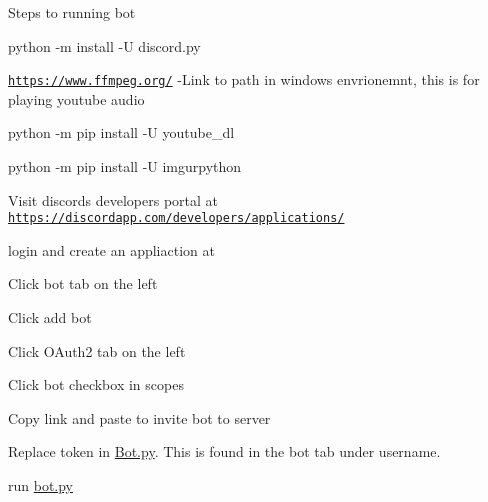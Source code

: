 Steps to running bot


\begin{DoxyEnumerate}
\item python -\/m install -\/U discord.\+py
\item \href{https://www.ffmpeg.org/}{\tt https\+://www.\+ffmpeg.\+org/} -\/\+Link to path in windows envrionemnt, this is for playing youtube audio
\item python -\/m pip install -\/U youtube\+\_\+dl
\item python -\/m pip install -\/U imgurpython
\item Visit discord\textquotesingle{}s developer\textquotesingle{}s portal at \href{https://discordapp.com/developers/applications/}{\tt https\+://discordapp.\+com/developers/applications/}
\item login and create an appliaction at
\item Click bot tab on the left
\item Click add bot
\item Click O\+Auth2 tab on the left
\item Click bot checkbox in scopes
\item Copy link and paste to invite bot to server
\item Replace token in \mbox{\hyperlink{_bot_8py}{Bot.\+py}}. This is found in the bot tab under username.
\end{DoxyEnumerate}
\begin{DoxyEnumerate}
\item run \mbox{\hyperlink{_bot_8py}{bot.\+py}} 
\end{DoxyEnumerate}